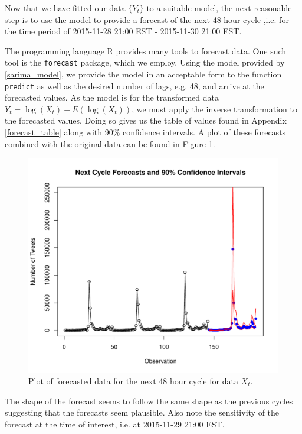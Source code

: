 Now that we have fitted our data $\{Y_t\}$ to a suitable model, the next
reasonable step is to use the model to provide a forecast of the next 48 hour cycle
,i.e. for the time period of 2015-11-28 21:00 EST - 2015-11-30 21:00 EST.

The programming language R provides many tools to forecast data. One such tool
is the \texttt{forecast} package, which we employ. Using the model provided by
\eqref{sarima_model}, we provide the model in an acceptable form to the
function \texttt{predict} as well as the desired number of lags, e.g. 48,
and arrive at the forecasted values. As the model is for the transformed data
$Y_t = \log(X_t) - E(\log(X_t))$, we must apply the inverse transformation to the
forecasted values. Doing so gives us the table of values found in Appendix
\ref{forecast_table} along with 90\% confidence intervals. A plot of these
forecasts combined with the original data can be found in Figure \ref{forecast_plot}.

\begin{figure}[!h]
  \centerline{\includegraphics[scale=0.75]{../analysis/plots/forecast}}
  \caption{Plot of forecasted data for the next 48 hour cycle for data $X_t$.}\label{forecast_plot}
\end{figure}

The shape of the forecast seems to follow the same shape as the previous cycles
suggesting that the forecasts seem plausible. Also note the sensitivity of
the forecast at the time of interest, i.e. at 2015-11-29 21:00 EST.